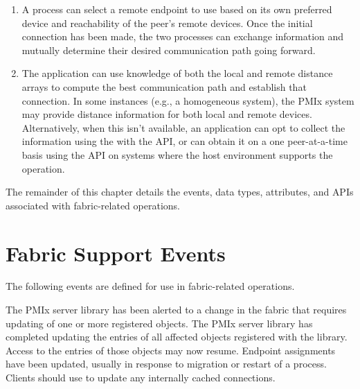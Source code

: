 \begin{enumerate}[label=\alph*)]
    \item A process can select a remote endpoint to use based on its own preferred device and reachability of the peer's remote devices. Once the initial connection has been made, the two processes can exchange information and mutually determine their desired communication path going forward.

    \item The application can use knowledge of both the local and remote distance arrays to compute the best communication path and establish that connection. In some instances (e.g., a homogeneous system), the \ac{PMIx} system may provide distance information for both local and remote devices. Alternatively, when this isn't available, an application can opt to collect the information using the  with the  \ac{API}, or can obtain it on a one peer-at-a-time basis using the  \ac{API} on systems where the host environment supports the  operation.

\end{enumerate}

The remainder of this chapter details the events, data types, attributes, and \acp{API} associated with fabric-related operations.


\section{Fabric Support Events}
\label{api:sched:consts}

The following events are defined for use in fabric-related operations.

\begin{constantdesc}
%
The \ac{PMIx} server library has been alerted to a change in the fabric that requires updating of one or more registered  objects.
%
The \ac{PMIx} server library has completed updating the entries of all affected  objects registered with the library. Access to the entries of those objects may now resume.
%
Endpoint assignments have been updated, usually in response to migration
or restart of a process. Clients should use  to update any
internally cached connections.
%
\end{constantdesc}


